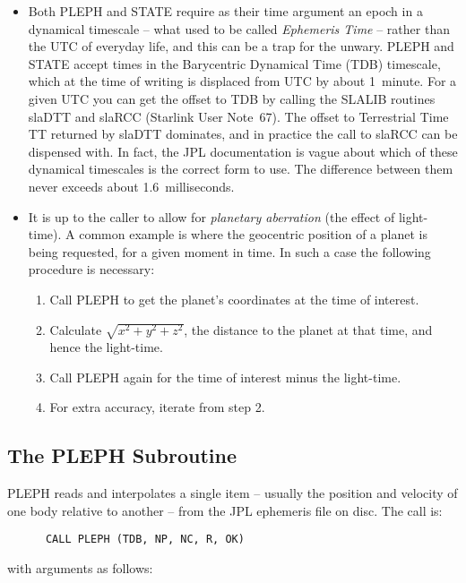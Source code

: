 \documentclass[twoside,11pt]{article}
\newcommand{\xref}[3]{#1}
\newcommand{\xlabel}[1]{}
\renewcommand{\_}{\texttt{\symbol{95}}}
\begin{document}
\begin{itemize}

\item Both PLEPH and STATE require as their time argument an epoch in a
dynamical timescale -- what used to be called \textit{Ephemeris Time}\/
-- rather than the UTC of everyday life, and this can be a trap for
the unwary.  PLEPH and STATE accept times in the Barycentric Dynamical
Time (TDB) timescale, which at the time of writing is displaced from
UTC by about 1~minute.  For a given UTC you can get the offset to TDB
by calling the SLALIB routines
\xref{sla\_DTT}{sun67}{SLA_DTT} and 
\xref{sla\_RCC}{sun67}{SLA_RCC}
(\xref{Starlink User Note~67}{sun67}{}).  
The offset to Terrestrial Time TT returned by 
\xref{sla\_DTT}{sun67}{SLA_DTT} 
dominates, and in practice the call to 
\xref{sla\_RCC}{sun67}{SLA_RCC} 
can be dispensed with.  In fact, the JPL documentation is vague
about which of these dynamical timescales is the correct form to use.
The difference between them never exceeds about 1.6~milliseconds.

\item It is up to the caller to allow for \textit{planetary aberration}\/
(the effect of light-time).  A common example is where the geocentric
position of a planet is being requested, for a given moment in time.
In such a case the following procedure is necessary:

\begin{enumerate}
\item Call PLEPH to get the planet's coordinates
at the time of interest.
\item Calculate $\sqrt{x^{2}+y^{2}+z^{2}}$,
the distance to the planet at that time,
and hence the light-time.
\item Call PLEPH again for the time of interest minus the
light-time.
\item For extra accuracy, iterate from step 2.
\end{enumerate}
\end{itemize}

\subsection{\xlabel{the_pleph_subroutine}The PLEPH Subroutine}
\label{the_pleph_subroutine}

PLEPH reads and interpolates a single item --
usually the position and velocity
of one body relative to another --
from the JPL ephemeris file on disc.
The call is:
\begin{verbatim}
      CALL PLEPH (TDB, NP, NC, R, OK)
\end{verbatim}
with arguments as follows:
\end{document}
